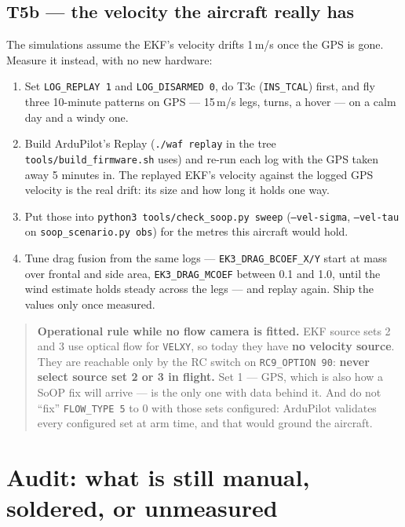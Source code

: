 \documentclass[11pt,a4paper]{article}
\newcommand{\file}[1]{\texttt{\small #1}}
\newcommand{\cmd}[1]{\texttt{\small #1}}
\newcommand{\flag}[1]{\textcolor{warnred}{\textbf{#1}}}
\begin{document}
\subsection{T5b --- the velocity the aircraft really has}

The simulations assume the EKF's velocity drifts 1\,m/s once the GPS is gone. Measure it
instead, with no new hardware:

\begin{enumerate}
\item Set \file{LOG\_REPLAY 1} and \file{LOG\_DISARMED 0}, do T3c (\file{INS\_TCAL}) first, and fly
three 10-minute patterns on GPS --- 15\,m/s legs, turns, a hover --- on a calm day and a windy one.
\item Build ArduPilot's Replay (\cmd{./waf replay} in the tree \file{tools/build\_firmware.sh}
uses) and re-run each log with the GPS taken away 5 minutes in. The replayed EKF's velocity
against the logged GPS velocity is the real drift: its size and how long it holds one way.
\item Put those into \cmd{python3 tools/check\_soop.py sweep} (\file{--vel-sigma},
\file{--vel-tau} on \file{soop\_scenario.py obs}) for the metres this aircraft would hold.
\item Tune drag fusion from the same logs --- \file{EK3\_DRAG\_BCOEF\_X/Y} start at mass over frontal
and side area, \file{EK3\_DRAG\_MCOEF} between 0.1 and 1.0, until the wind estimate holds steady
across the legs --- and replay again. Ship the values only once measured.
\end{enumerate}

\begin{quote}
\flag{Operational rule while no flow camera is fitted.} EKF source sets 2 and 3 use optical
flow for \file{VELXY}, so today they have \textbf{no velocity source}. They are reachable
only by the RC switch on \file{RC9\_OPTION 90}: \textbf{never select source set 2 or 3 in
flight.} Set 1 --- GPS, which is also how a SoOP fix will arrive --- is the only one with
data behind it. And do not ``fix'' \file{FLOW\_TYPE 5} to 0 with those sets configured:
ArduPilot validates every configured set at arm time, and that would ground the aircraft.
\end{quote}

\section{Audit: what is still manual, soldered, or unmeasured}
\end{document}
